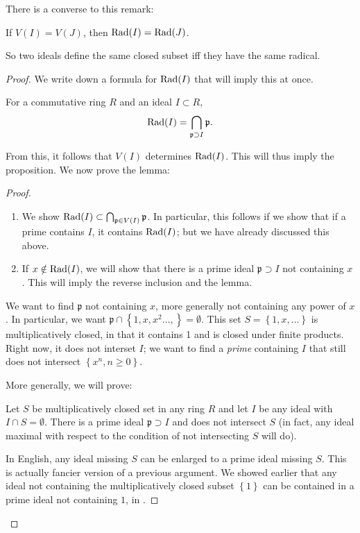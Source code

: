 There is a converse to this remark:
\begin{proposition} 
If $V(I) = V(J)$, then $\operatorname{Rad}(I) = \operatorname{Rad}(J)$. 
\end{proposition} 
So two ideals define the same closed subset iff they have the
same radical.
\begin{proof} 
We write down a formula for $\operatorname{Rad}(I)$ that will imply this at
once.
\begin{lemma} \label{radprimescontaining} For a commutative ring $R$ and an
ideal $I \subset
R$,
\[ \operatorname{Rad}(I) = \bigcap_{\mathfrak{p} \supset I} \mathfrak{p}.  \]
\end{lemma} 
From this, it follows that $V(I)$ determines $\operatorname{Rad}(I)$. This
will thus imply
the proposition.  
We now prove the lemma:
\begin{proof} 
\begin{enumerate}
\item We show $\operatorname{Rad}(I) \subset \bigcap_{\mathfrak{p} \in V(I)}
\mathfrak{p} $. In
particular, this follows if we show that if a prime contains
$I$, it contains $\operatorname{Rad}(I)$; but we have already
discussed this above.  
\item If $x \notin \operatorname{Rad}(I)$, we will show that there is a prime
ideal $\mathfrak{p}
\supset I$ not containing $x$. This will imply the reverse
inclusion and the
lemma.  
\end{enumerate}


We want to find $\mathfrak{p}$ not containing $x$, more
generally not
containing any power of $x$. In particular, we want
$\mathfrak{p} \cap \left\{1,
x, x^2 \dots, \right\} = \emptyset$. This set $S = \left\{1, x,
\dots\right\}$
is multiplicatively closed, in that it contains 1 and is closed
under
finite products. Right now, it does not interset $I$; we want to find
a
\emph{prime} containing $I$ that still does not intersect $\left\{x^n, n
\geq 0\right\}$.


More generally, we will prove:

\begin{sublemma}\label{sublemmamultclosed}
Let $S$ be multiplicatively closed set in any ring $R$ and let
$I$ be any ideal with $I \cap S =
\emptyset$. There is a prime ideal $\mathfrak{p} \supset I$ and
does not
intersect $S$ (in fact, any ideal maximal with respect to the condition of
not intersecting $S$ will do).  
\end{sublemma}
In English, any ideal missing $S$ can be enlarged to a prime
ideal missing $S$.
This is actually fancier version of a previous argument. We
showed earlier that any ideal not
containing the multiplicatively closed subset $\left\{1\right\}$
can be
contained in a prime ideal not containing $1$, in
.


\end{proof}
\end{proof}

